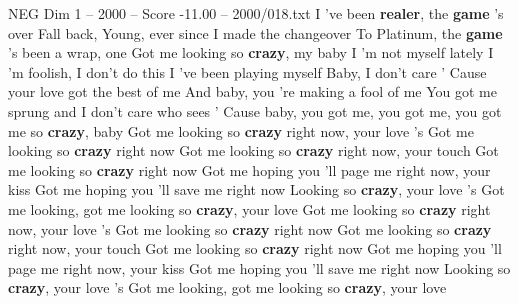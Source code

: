 \begin{textsample}{NEG Dim 1 – 2000 – Score -11.00 – 2000/018.txt}
I 've been \textbf{realer}, the \textbf{game} 's over Fall back, Young, ever since I made the changeover To Platinum, the \textbf{game} 's been a wrap, one Got me looking so \textbf{crazy}, my baby I 'm not myself lately I 'm foolish, I don't do this I 've been playing myself Baby, I don't care ' Cause your love got the best of me And baby, you 're making a fool of me You got me sprung and I don't care who sees ' Cause baby, you got me, you got me, you got me so \textbf{crazy}, baby Got me looking so \textbf{crazy} right now, your love 's Got me looking so \textbf{crazy} right now Got me looking so \textbf{crazy} right now, your touch Got me looking so \textbf{crazy} right now Got me hoping you 'll page me right now, your kiss Got me hoping you 'll save me right now Looking so \textbf{crazy}, your love 's Got me looking, got me looking so \textbf{crazy}, your love Got me looking so \textbf{crazy} right now, your love 's Got me looking so \textbf{crazy} right now Got me looking so \textbf{crazy} right now, your touch Got me looking so \textbf{crazy} right now Got me hoping you 'll page me right now, your kiss Got me hoping you 'll save me right now Looking so \textbf{crazy}, your love 's Got me looking, got me looking so \textbf{crazy}, your love

\end{textsample}
